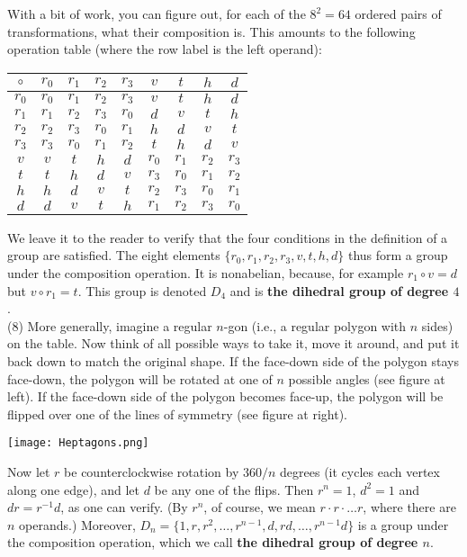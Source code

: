 \documentclass[leqno]{book}
\begin{document}
With a bit of work, you can figure out, for each of the $8^2=64$ ordered pairs of transformations, what their composition is.  This amounts to the following operation table (where the row label is the left operand):
\begin{center}
\begin{tabular}{c|cccccccc}
$\circ$ & $r_0$ & $r_1$ & $r_2$ & $r_3$ & $v$ & $t$ & $h$ & $d$\\\hline
$r_0$ & $r_0$ & $r_1$ & $r_2$ & $r_3$ & $v$ & $t$ & $h$ & $d$\\
$r_1$ & $r_1$ & $r_2$ & $r_3$ & $r_0$ & $d$ & $v$ & $t$ & $h$\\
$r_2$ & $r_2$ & $r_3$ & $r_0$ & $r_1$ & $h$ & $d$ & $v$ & $t$\\
$r_3$ & $r_3$ & $r_0$ & $r_1$ & $r_2$ & $t$ & $h$ & $d$ & $v$\\
$v$ & $v$ & $t$ & $h$ & $d$ & $r_0$ & $r_1$ & $r_2$ & $r_3$\\
$t$ & $t$ & $h$ & $d$ & $v$ & $r_3$ & $r_0$ & $r_1$ & $r_2$\\
$h$ & $h$ & $d$ & $v$ & $t$ & $r_2$ & $r_3$ & $r_0$ & $r_1$\\
$d$ & $d$ & $v$ & $t$ & $h$ & $r_1$ & $r_2$ & $r_3$ & $r_0$
\end{tabular}
\end{center}
We leave it to the reader to verify that the four conditions in the definition of a group are satisfied.  The eight elements $\{r_0,r_1,r_2,r_3,v,t,h,d\}$ thus form a group under the composition operation.  It is nonabelian, because, for example $r_1\circ v=d$ but $v\circ r_1=t$.  This group is denoted $D_4$ and is \textbf{the dihedral group of degree $4$}.\\

(8) More generally, imagine a regular $n$-gon (i.e., a regular polygon with $n$ sides) on the table.  Now think of all possible ways to take it, move it around, and put it back down to match the original shape.  If the face-down side of the polygon stays face-down, the polygon will be rotated at one of $n$ possible angles (see figure at left).  If the face-down side of the polygon becomes face-up, the polygon will be flipped over one of the lines of symmetry (see figure at right).
\begin{center}\texttt{[image: Heptagons.png]}\end{center}

Now let $r$ be counterclockwise rotation by $360/n$ degrees (it cycles each vertex along one edge), and let $d$ be any one of the flips.  Then $r^n=1$, $d^2=1$ and $dr=r^{-1}d$, as one can verify.  (By $r^n$, of course, we mean $r\cdot r\cdot\dots r$, where there are $n$ operands.)  Moreover, $D_n=\{1,r,r^2,\dots,r^{n-1},d,rd,\dots,r^{n-1}d\}$ is a group under the composition operation, which we call \textbf{the dihedral group of degree $n$}.\\
\end{document}
